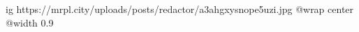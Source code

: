  
 
 
 
 

\ifcmt
  ig https://mrpl.city/uploads/posts/redactor/a3ahgxysnope5uzi.jpg
  @wrap center
  @width 0.9
\fi
